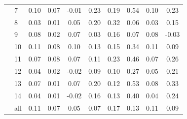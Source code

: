 \begin{tabular}{l l cccccccc}
 & 7 & 0.10 & 0.07 & -0.01 & 0.23 & 0.19 & 0.54 & 0.10 & 0.23 \\
 & 8 & 0.03 & 0.01 & 0.05 & 0.20 & 0.32 & 0.06 & 0.03 & 0.15 \\
 & 9 & 0.08 & 0.02 & 0.07 & 0.03 & 0.16 & 0.07 & 0.08 & -0.03 \\
 & 10 & 0.11 & 0.08 & 0.10 & 0.13 & 0.15 & 0.34 & 0.11 & 0.09 \\
 & 11 & 0.07 & 0.08 & 0.07 & 0.11 & 0.23 & 0.46 & 0.07 & 0.26 \\
 & 12 & 0.04 & 0.02 & -0.02 & 0.09 & 0.10 & 0.27 & 0.05 & 0.21 \\
 & 13 & 0.07 & 0.01 & 0.07 & 0.20 & 0.12 & 0.53 & 0.08 & 0.33 \\
 & 14 & 0.04 & 0.01 & -0.02 & 0.16 & 0.13 & 0.40 & 0.04 & 0.24 \\
 & all & 0.11 & 0.07 & 0.05 & 0.07 & 0.17 & 0.13 & 0.11 & 0.09 \\
\bottomrule
\end{tabular}
